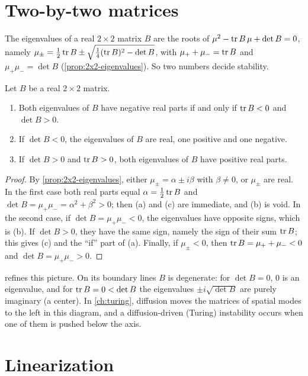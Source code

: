 \section{Two-by-two matrices}\label{sec:ode-2x2}

The eigenvalues of a real $2\times2$ matrix $B$ are the roots of
$\mu^2-\operatorname{tr} B\,\mu+\det B=0$, namely
$\mu_\pm=\frac12\operatorname{tr} B\pm\sqrt{\frac14(\operatorname{tr} B)^2-\det B}$, with
$\mu_++\mu_-=\operatorname{tr} B$ and $\mu_+\mu_-=\det B$ (\cref{prop:2x2-eigenvalues}). So two
numbers decide stability.

\begin{lemma}\label{lem:trace-det}
Let $B$ be a real $2\times2$ matrix.
\begin{enumerate}[label=(\alph*)]
  \item Both eigenvalues of $B$ have negative real parts if and only if
        $\operatorname{tr} B<0$ and $\det B>0$.
  \item If $\det B<0$, the eigenvalues of $B$ are real, one positive and one
        negative.
  \item If $\det B>0$ and $\operatorname{tr} B>0$, both eigenvalues of $B$ have positive real
        parts.
\end{enumerate}
\end{lemma}

\begin{proof}
By \cref{prop:2x2-eigenvalues}, either $\mu_\pm=\alpha\pm i\beta$ with $\beta\neq0$,
or $\mu_\pm$ are real. In the first case both real parts equal
$\alpha=\frac12\operatorname{tr} B$ and $\det B=\mu_+\mu_-=\alpha^2+\beta^2>0$; then (a) and (c)
are immediate, and (b) is void. In the second case, if $\det B=\mu_+\mu_-<0$, the
eigenvalues have opposite signs, which is (b). If $\det B>0$, they have the same
sign, namely the sign of their sum $\operatorname{tr} B$; this gives (c) and the ``if'' part of
(a). Finally, if $\mu_\pm<0$, then $\operatorname{tr} B=\mu_++\mu_-<0$ and $\det B=\mu_+\mu_->0$.
\end{proof}

 refines this picture. On its boundary lines $B$ is
degenerate: for $\det B=0$, $0$ is an eigenvalue, and for $\operatorname{tr} B=0<\det B$ the
eigenvalues $\pm i\sqrt{\det B}$ are purely imaginary (a center). In
\cref{ch:turing}, diffusion moves the matrices of spatial modes to the left in this
diagram, and a diffusion-driven (Turing) instability occurs when one of them is
pushed below the axis.

\section{Linearization}\label{sec:ode-linearization}


